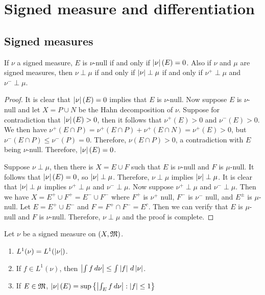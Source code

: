 \documentclass[a4paper]{article}
\begin{document}
\setcounter{section}{2}
\section{Signed measure and differentiation}

\subsection{Signed measures}

\begin{ex}[Folland 3.2]
If $\nu$ a signed measure, $E$ is $\nu$-null if and only if 
$\left\lvert \nu\right\rvert(E) = 0$. Also if $\nu$ and $\mu$ are signed measures,
then $\nu \perp \mu$ if and only if $\left\lvert \nu\right\rvert \perp \mu$ 
if and only if $\nu^+ \perp \mu$ and $\nu^- \perp \mu$.
\end{ex}

\begin{proof}
It is clear that $\left\lvert \nu\right\rvert(E) = 0$ implies that $E$ is $\nu$-null.
Now suppose $E$ is $\nu$-null and let $X = P \cup N$ be the 
Hahn decomposition of $\nu$. Suppose for contradiction 
that $\left\lvert \nu\right\rvert(E) > 0$, then it follows that 
$\nu^+(E) > 0$ and $\nu^- (E) > 0$. We then have 
$\nu^+(E \cap P) = \nu^+ (E \cap P) + \nu^+ (E \cap N) = \nu^+(E)
> 0$, but $\nu^- (E \cap P) \leq \nu^- (P) = 0$. Therefore, 
$\nu(E \cap P) > 0$, a contradiction with $E$ being $\nu$-null.
Therefore, $\left\lvert \nu\right\rvert(E) = 0$.

Suppose $\nu \perp \mu$, then there is $X = E \cup F$ such that 
$E$ is $\nu$-null and $F$ is $\mu$-null. It follows that 
$\left\lvert \nu\right\rvert(E) = 0$, so $\left\lvert \nu\right\rvert \perp \mu$. Therefore, 
$\nu \perp \mu$ implies $\left\lvert \nu\right\rvert \perp \mu$. It is clear 
that $\left\lvert \nu\right\rvert \perp \mu$ implies $\nu^+ \perp \mu$
and $\nu^- \perp \mu$. Now suppose 
$\nu^+ \perp \mu$ and $\nu^- \perp \mu$. Then we have 
$X = E^+ \cup F^+ = E^- \cup F^-$ where $F^+$ is $\nu^+$ null,
$F^-$ is $\nu^-$ null, and $E^\pm$ is $\mu$-null. Let 
$E = E^+ \cup E^-$ and $F = F^+ \cap F^- = E^c$. Then we can 
verify that $E$ is $\mu$-null and $F$ is $\nu$-null. Therefore, 
$\nu \perp \mu$ and the proof is complete.
\end{proof}

\begin{ex}[Folland 3.3]
Let $\nu$ be a signed measure on $(X, \mathfrak{M})$. 
\begin{enumerate}
  \item $L^1 (\nu) = L^1(\left\lvert \nu\right\rvert)$.
  \item If $f \in L^1 (\nu)$, then $\left\lvert \int f \, d \nu\right\rvert
  \leq \int \left\lvert f\right\rvert \, d \left\lvert \nu\right\rvert$.
  \item If $E \in \mathfrak{M}$, $\left\lvert \nu\right\rvert(E) = \sup 
  \left\{ \left\lvert \int_E f \, d \nu\right\rvert : \left\lvert f\right\rvert \leq 1 \right\}$
\end{enumerate}  
\end{ex}
\end{document}
